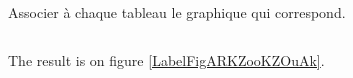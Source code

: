 
Associer à chaque tableau le graphique qui correspond.


\begin{equation}
    
\end{equation}

The result is on figure \ref{LabelFigARKZooKZOuAk}. %
\newcommand{\CaptionFigARKZooKZOuAk}{<+Type your caption here+>}



